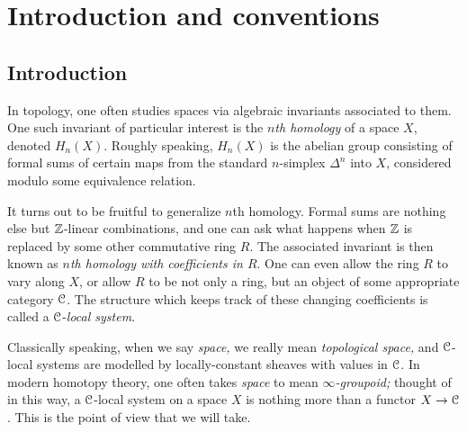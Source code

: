 \documentclass[main.tex]{subfiles}
\begin{document}
\section{Introduction and conventions}
\label{sec:introduction_and_conventions}

\subsection{Introduction}
\label{ssc:introduction}

In topology, one often studies spaces via algebraic invariants associated to them. One such invariant of particular interest is the \emph{$n$th homology} of a space $X$, denoted $H_{n}(X)$. Roughly speaking, $H_{n}(X)$ is the abelian group consisting of formal sums of certain maps from the standard $n$-simplex $\Delta^{n}$ into $X$, considered modulo some equivalence relation.

It turns out to be fruitful to generalize $n$th homology. Formal sums are nothing else but $\mathbb{Z}$-linear combinations, and one can ask what happens when $\mathbb{Z}$ is replaced by some other commutative ring $R$. The associated invariant is then known as \emph{$n$th homology with coefficients in $R$}. One can even allow the ring $R$ to vary along $X$, or allow $R$ to be not only a ring, but an object of some appropriate category $\mathcal{C}$. The structure which keeps track of these changing coefficients is called a $\mathcal{C}$-\emph{local system}.

Classically speaking, when we say \emph{space,} we really mean \emph{topological space,} and $\mathcal{C}$-local systems are modelled by locally-constant sheaves with values in $\mathcal{C}$. In modern homotopy theory, one often takes \emph{space} to mean \emph{$\infty$-groupoid;} thought of in this way, a $\mathcal{C}$-local system on a space $X$ is nothing more than a functor $X \to \mathcal{C}$. This is the point of view that we will take.
\end{document}
